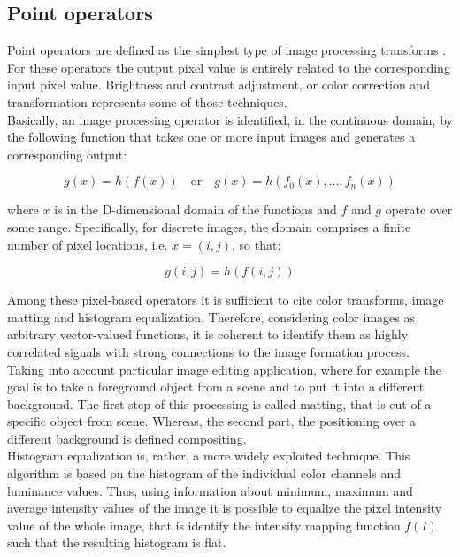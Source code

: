 \subsection{Point operators}
\label{subsection:point-operators}

Point operators are defined as the simplest type of image processing transforms \cite{Szeliski2011}.
For these operators the output pixel value is entirely related to the corresponding input pixel value.
Brightness and contrast adjustment, or color correction and transformation represents some of those techniques.\\
Basically, an image processing operator is identified, in the continuous domain, by the following function that takes one or more input images and generates a corresponding output:

\begin{equation}
 \label{eqn:img-operator}
 g(x) = h(f(x)) \quad 	\mbox{or} \quad g(x) = h(f_0(x), ..., f_n(x))
\end{equation}

where $x$ is in the D-dimensional domain of the functions and $f$ and $g$ operate over some range.
Specifically, for discrete images, the domain comprises a finite number of pixel locations, i.e. $x = (i, j)$, so that:

\begin{equation}
	g(i, j) = h(f(i,j))
\end{equation}

Among these pixel-based operators it is sufficient to cite color transforms, image matting and histogram equalization. 
Therefore, considering color images as arbitrary vector-valued functions, it is coherent to identify them as highly correlated signals with strong connections to the image formation process. \\
Taking into account particular image editing application, where for example the goal is to take a foreground object from a scene and to put it into a different background.
The first step of this processing is called matting, that is cut of a specific object from scene. 
Whereas, the second part, the positioning over a different background is defined compositing.\\
Histogram equalization is, rather, a more widely exploited technique. 
This algorithm is based on the histogram of the individual color channels and luminance values.
Thus, using information about minimum, maximum and average intensity values of the image it is possible to equalize the pixel intensity value of the whole image, that is identify the intensity mapping function $f(I)$ such that the resulting histogram is flat. 

